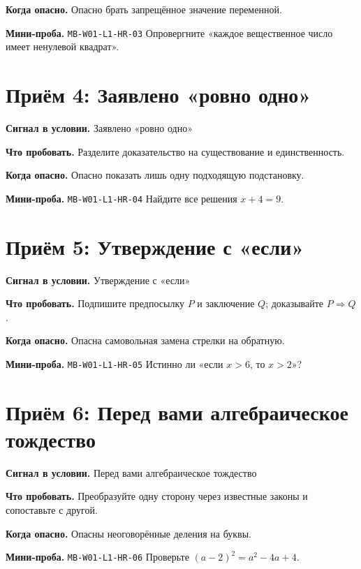 \documentclass[11pt,a4paper,openany]{book}
\newcommand{\muid}[1]{\texttt{\footnotesize #1}}
\begin{document}
\textbf{Когда опасно.} Опасно брать запрещённое значение переменной.\par \textbf{Мини-проба.} \muid{MB-W01-L1-HR-03} Опровергните «каждое вещественное число имеет ненулевой квадрат».


\section{Приём 4: Заявлено «ровно одно»}

\begin{keybox}\textbf{Сигнал в условии.} Заявлено «ровно одно»\par \textbf{Что пробовать.} Разделите доказательство на существование и единственность.\end{keybox}

\textbf{Когда опасно.} Опасно показать лишь одну подходящую подстановку.\par \textbf{Мини-проба.} \muid{MB-W01-L1-HR-04} Найдите все решения $x+4=9$.


\section{Приём 5: Утверждение с «если»}

\begin{keybox}\textbf{Сигнал в условии.} Утверждение с «если»\par \textbf{Что пробовать.} Подпишите предпосылку $P$ и заключение $Q$; доказывайте $P\Rightarrow Q$.\end{keybox}

\textbf{Когда опасно.} Опасна самовольная замена стрелки на обратную.\par \textbf{Мини-проба.} \muid{MB-W01-L1-HR-05} Истинно ли «если $x>6$, то $x>2$»?


\section{Приём 6: Перед вами алгебраическое тождество}

\begin{keybox}\textbf{Сигнал в условии.} Перед вами алгебраическое тождество\par \textbf{Что пробовать.} Преобразуйте одну сторону через известные законы и сопоставьте с другой.\end{keybox}

\textbf{Когда опасно.} Опасны неоговорённые деления на буквы.\par \textbf{Мини-проба.} \muid{MB-W01-L1-HR-06} Проверьте $(a-2)^2=a^2-4a+4$.
\end{document}
